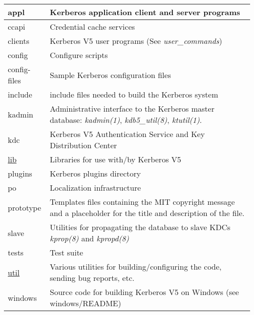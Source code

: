 \documentclass[letterpaper,10pt,english]{sphinxmanual}
\begin{document}
\begin{tabulary}{\linewidth}{|L|L|}
\hline

appl
 & 
Kerberos application client and server programs
\\
\hline
ccapi
 & 
Credential cache services
\\
\hline
clients
 & 
Kerberos V5 user programs (See \emph{user\_commands})
\\
\hline
config
 & 
Configure scripts
\\
\hline
config-files
 & 
Sample Kerberos configuration files
\\
\hline
include
 & 
include files needed to build the Kerberos system
\\
\hline
kadmin
 & 
Administrative interface to the Kerberos master database: \emph{kadmin(1)}, \emph{kdb5\_util(8)}, \emph{ktutil(1)}.
\\
\hline
kdc
 & 
Kerberos V5 Authentication Service and Key Distribution Center
\\
\hline
{\hyperref[build/directory_org:lib]{lib}}
 & 
Libraries for use with/by Kerberos V5
\\
\hline
plugins
 & 
Kerberos plugins directory
\\
\hline
po
 & 
Localization infrastructure
\\
\hline
prototype
 & 
Templates files containing the MIT copyright message and a placeholder for the title and description of the file.
\\
\hline
slave
 & 
Utilities for propagating the database to slave KDCs \emph{kprop(8)} and \emph{kpropd(8)}
\\
\hline
tests
 & 
Test suite
\\
\hline
{\hyperref[build/directory_org:util]{util}}
 & 
Various utilities for building/configuring the code, sending bug reports, etc.
\\
\hline
windows
 & 
Source code for building Kerberos V5 on Windows (see windows/README)
\\
\hline\end{tabulary}
\end{document}
